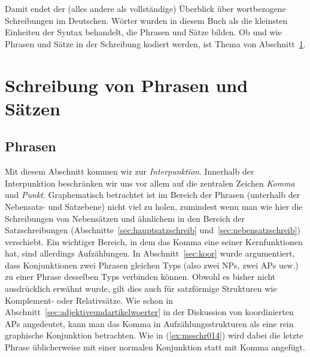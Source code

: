 Damit endet der (alles andere als vollständige) Überblick über wortbezogene Schreibungen im Deutschen.
Wörter wurden in diesem Buch als die kleinsten Einheiten der Syntax behandelt, die Phrasen und Sätze bilden.
Ob und wie Phrasen und Sätze in der Schreibung kodiert werden, ist Thema von Abschnitt~\ref{sec:satzschreib}.




\section{Schreibung von Phrasen und Sätzen}

\label{sec:satzschreib}

\subsection{Phrasen}

\label{sec:phrasenschrift}
\label{sec:koordinschreib}

Mit diesem Abschnitt kommen wir zur \textit{Interpunktion}.
Innerhalb der Interpunktion beschränken wir uns vor allem auf die zentralen Zeichen \textit{Komma} und \textit{Punkt}.
Graphematisch betrachtet ist im Bereich der Phrasen (unterhalb der Nebensatz- und Satzebene) nicht viel zu holen, zumindest wenn man wie hier die Schreibungen von Nebensätzen und ähnlichem in den Bereich der Satzschreibungen (Abschnitte~\ref{sec:hauptsatzschreib} und~\ref{sec:nebensatzschreib}) verschiebt.
Ein wichtiger Bereich, in dem das Komma eine seiner Kernfunktionen hat, sind allerdings Aufzählungen.
In Abschnitt~\ref{sec:koor} wurde argumentiert, dass Konjunktionen zwei Phrasen gleichen Typs (also zwei NPs, zwei APs usw.) zu einer Phrase desselben Typs verbinden können.
Obwohl es bisher nicht ausdrücklich erwähnt wurde, gilt dies auch für satzförmige Strukturen wie Komplement- oder Relativsätze.
Wie schon in Abschnitt~\ref{sec:adjektiveundartikelwoerter} in der Diskussion von koordinierten APs angedeutet, kann man das Komma in Aufzählungsstrukturen als eine rein graphische Konjunktion betrachten.
Wie in (\ref{ex:msschr014}) wird dabei die letzte Phrase üblicherweise mit einer normalen Konjunktion statt mit Komma angefügt.

